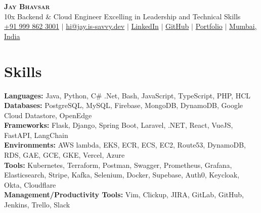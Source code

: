 \documentclass[letterpaper,11pt]{article}
\newcommand{\resumeSubHeadingListStart}{\begin{itemize}[leftmargin=0.15in, label={}]}
\newcommand{\resumeSubHeadingListEnd}{\end{itemize}}
\begin{document}

\begin{center}
  \textbf{\Huge \scshape Jay Bhavsar} \\ \vspace{3pt}
  \normalsize 10x Backend \& Cloud Engineer Excelling in Leadership and Technical Skills \\ \vspace{3pt}
  \small
  \faMobile \hspace{.5pt} \href{tel:919998623001}{+91 999 862 3001}
  $|$
  \faAt \hspace{.5pt} \href{mailto:hi@jay.is-savvy.dev}{hi@jay.is-savvy.dev}
  $|$
  \faLinkedinSquare \hspace{.5pt} \href{https://www.linkedin.com/in/jbhv12/}{LinkedIn}
  $|$
  \faGithub \hspace{.5pt} \href{https://github.com/jbhv12}{GitHub}
  $|$
  \faGlobe \hspace{.5pt} \href{https://jay.is-savvy.dev/}{Portfolio}
  $|$
  \faMapMarker \hspace{.5pt} \href{https://goo.gl/maps/Czh1vXePukiKumpu5}{Mumbai, India}
\end{center}




\section{Skills}
\vspace{2pt}
\resumeSubHeadingListStart
\small{\item{
              \textbf{Languages:}{ Java, Python, C\# .Net, Bash, JavaScript, TypeScript, PHP, HCL} \\ \vspace{3pt}
              \textbf{Databases:}{ PostgreSQL, MySQL, Firebase, MongoDB, DynamoDB, Google Cloud Datastore, OpenEdge} \\ \vspace{3pt}
              \textbf{Frameworks:}{ Flask, Django, Spring Boot, Laravel, .NET, React, VueJS, FastAPI, LangChain} \\ \vspace{3pt}
              \textbf{Environments:}{ AWS lambda, EKS, ECR, ECS, EC2, Route53, DynamoDB, RDS, GAE, GCE, GKE, Vercel, Azure} \\ \vspace{3pt}
              \textbf{Tools:}{ Kubernetes, Terraform, Postman, Swagger, Prometheus, Grafana, Elasticsearch, Stripe, Kafka, Selenium, Docker, Supebase, Auth0, Keycloak, Okta, Cloudflare} \\ \vspace{3pt}
              \textbf{Management/Productivity Tools:}{ Vim, Clickup, JIRA, GitLab, GitHub, Jenkins, Trello, Slack} \\ \vspace{3pt}
        }}
\resumeSubHeadingListEnd
\end{document}
